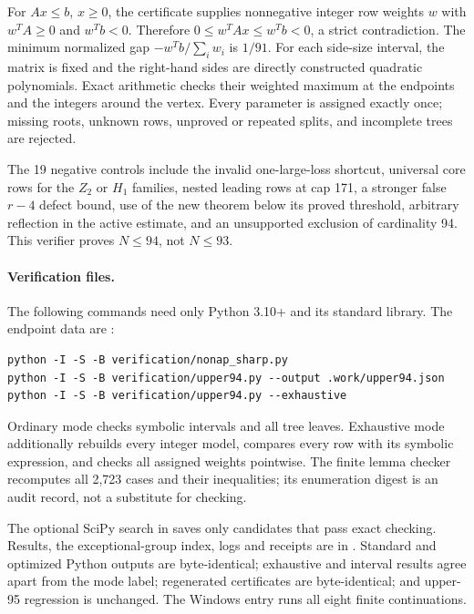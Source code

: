 \documentclass[11pt,a4paper]{article}
\begin{document}
For $Ax\le b$, $x\ge0$, the certificate supplies nonnegative integer
row weights $w$ with $w^TA\ge0$ and $w^Tb<0$. Therefore
$0\le w^TAx\le w^Tb<0$, a strict contradiction. The minimum normalized
gap $-w^Tb/\sum_iw_i$ is $1/91$. For each side-size interval, the matrix
is fixed and the right-hand sides are directly constructed quadratic
polynomials. Exact arithmetic checks their weighted maximum at the
endpoints and the integers around the vertex. Every parameter is assigned
exactly once; missing roots, unknown rows, unproved or repeated splits,
and incomplete trees are rejected.

The 19 negative controls include the invalid one-large-loss shortcut,
universal core rows for the $Z_2$ or $H_1$ families, nested leading rows
at cap 171, a stronger false $r-4$ defect bound, use of the new theorem
below its proved threshold, arbitrary reflection in the active estimate,
and an unsupported exclusion of cardinality 94. This verifier proves
$N\le94$, not $N\le93$.

\paragraph{Verification files.}
The following commands need only Python 3.10+ and its standard library.
The endpoint data are :
\begin{verbatim}
python -I -S -B verification/nonap_sharp.py
python -I -S -B verification/upper94.py --output .work/upper94.json
python -I -S -B verification/upper94.py --exhaustive
\end{verbatim}
Ordinary mode checks symbolic intervals and all tree leaves. Exhaustive
mode additionally rebuilds every integer model, compares every row with
its symbolic expression, and checks all assigned weights pointwise.
The finite lemma checker recomputes all 2,723 cases and their inequalities;
its enumeration digest is an audit record, not a substitute for checking.

The optional SciPy search in
 saves only candidates
that pass exact checking. Results, the exceptional-group index, logs and
receipts are in . Standard and optimized
Python outputs are byte-identical; exhaustive and interval results agree
apart from the mode label; regenerated certificates are byte-identical;
and upper-95 regression is unchanged. The Windows entry
 runs all eight finite continuations.
\end{document}
